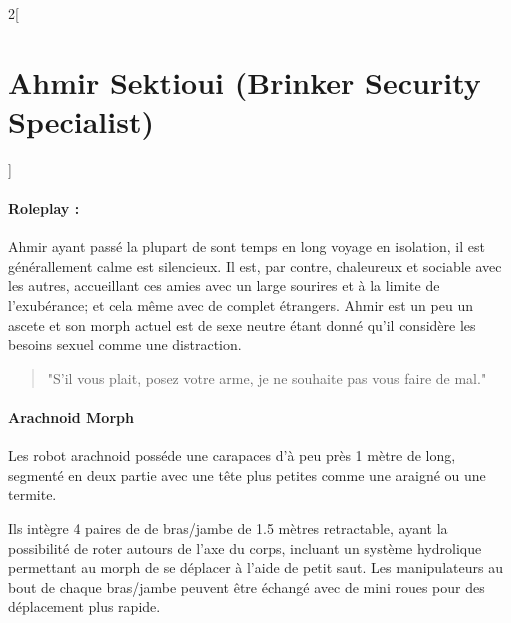\documentclass[a4paper,9pt]{article}
\begin{document}
\begin{multicols}{2}[\section*{Ahmir Sektioui (Brinker Security Specialist)}]
   \paragraph{Roleplay :}
   Ahmir ayant passé la plupart de sont temps en long voyage en isolation, il
   est générallement calme est silencieux.
   Il est, par contre, chaleureux et sociable avec les autres, accueillant ces
   amies avec un large sourires et à la limite de l'exubérance; et cela
   même avec de complet étrangers.
   Ahmir est un peu un ascete et son morph actuel est de sexe neutre étant
   donné qu'il considère les besoins sexuel comme une distraction.

   \begin{quote}
      "S'il vous plait, posez votre arme, je ne souhaite pas vous faire
      de mal."
   \end{quote}

   \paragraph{Arachnoid Morph}
   Les robot arachnoid posséde une carapaces d'à peu près 1 mètre de long,
   segmenté en deux partie avec une tête plus petites comme une araigné
   ou une termite.

   Ils intègre 4 paires de de bras/jambe de 1.5 mètres retractable, ayant la
   possibilité de roter autours de l'axe du corps, incluant un système
   hydrolique permettant au morph de se déplacer à l'aide de petit saut.
   Les manipulateurs au bout de chaque bras/jambe peuvent être échangé avec
   de mini roues pour des déplacement plus rapide.


\end{multicols}
\end{document}
